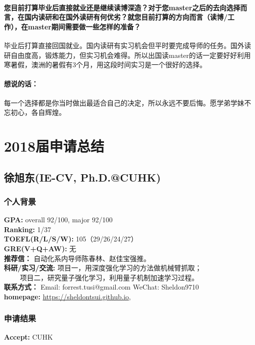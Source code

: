 \documentclass[a4paper,UTF8]{book}
\begin{document}
    \subsubsection*{您目前打算毕业后直接就业还是继续读博深造？对于您master之后的去向选择而言，在国内读研和在国外读研有何优劣？就您目前打算的方向而言（读博/工作），在master期间需要做一些怎样的准备？}
    毕业后打算直接回国就业。国内读研有实习机会但平时要完成导师的任务。国外读研自由度高，锻炼能力，但实习机会难得。所以出国读master的话一定要好好利用寒暑假，澳洲的暑假有3个月，用这段时间实习是一个很好的选择。

    \subsubsection{想说的话：}
    每一个选择都是你当时做出最适合自己的决定，所以永远不要后悔。愿学弟学妹不忘初心，各自辉煌。



\chapter{2018届申请总结}

\clearpage
\section{徐旭东(IE-CV, Ph.D.@CUHK)}
    \subsection*{个人背景}
        \textbf{GPA:} overall 92/100, major 92/100 \\
        \textbf{Ranking:} 1/37\\
        \textbf{TOEFL(R/L/S/W):} 105（29/26/24/27）\\
        \textbf{GRE(V+Q+AW):} 无\\
        \textbf{推荐信：} 自动化系内导师陈春林、赵佳宝强推。\\
        \textbf{科研/实习/交流:} 项目一，用深度强化学习的方法做机械臂抓取；\\ $\qquad$ 项目二，研究量子强化学习，利用量子机制加速学习过程。\\ 
        \textbf{联系方式：} Email: forrest.tusi@gmail.com WeChat: Sheldon9710   \\
        \textbf{homepage: } \url{https://sheldontsui.github.io}, 

    \subsection*{申请结果}
        \textbf{Accept:} CUHK
\end{document}
